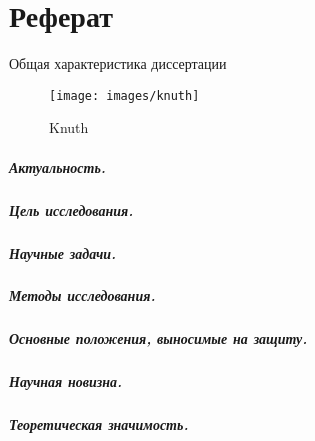 \renewcommand{\figurename}{Рисунок}
\renewcommand{\tablename}{Таблица}
\renewcommand\thesubfigure{\asbuk{subfigure}}

\chapter*{Реферат}

\begin{center}
    Общая характеристика диссертации
\end{center}

\begin{figure}
    \centering
    \texttt{[image: images/knuth]}
    \caption{Knuth}
    \label{fig:my_label2}
\end{figure}


\paragraph*{Актуальность.}

\paragraph*{Цель исследования.}
\paragraph*{Научные задачи.}

\paragraph*{Методы исследования.}


\paragraph*{Основные положения, выносимые на защиту.}

\paragraph*{Научная новизна.}

\paragraph*{Теоретическая значимость.}
